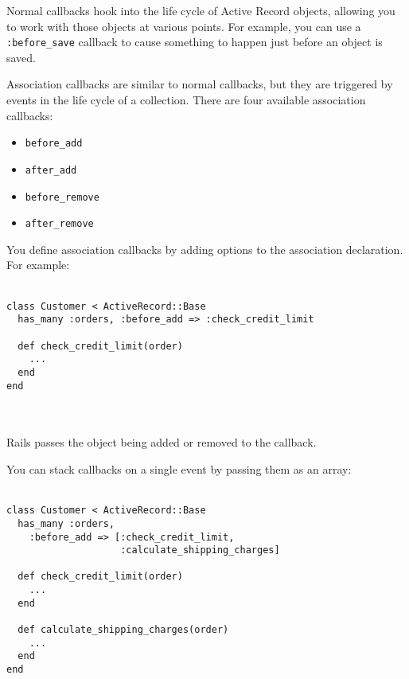 \documentclass[10pt]{book}
\begin{document}
Normal callbacks hook into the life cycle of Active Record objects,  allowing you to work with those objects at various points. For example,  you can use a \texttt{:before\_save} callback to cause something to happen just before an object is saved.

Association callbacks are similar to normal callbacks, but they are  triggered by events in the life cycle of a collection. There are four  available association callbacks:
\begin{itemize}
	\item \texttt{before\_add}
	\item \texttt{after\_add}
	\item \texttt{before\_remove}
	\item \texttt{after\_remove}
\end{itemize}

You define association callbacks by adding options to the association declaration. For example:
\\ \\
\begin{minipage}{\textwidth}{\scriptsize
\begin{verbatim}
class Customer < ActiveRecord::Base
  has_many :orders, :before_add => :check_credit_limit
 
  def check_credit_limit(order)
    ...
  end
end
\end{verbatim}}
\end{minipage}
\\ \\

Rails passes the object being added or removed to the callback.

You can stack callbacks on a single event by passing them as an array:
\\ \\
\begin{minipage}{\textwidth}{\scriptsize
\begin{verbatim}
class Customer < ActiveRecord::Base
  has_many :orders,
    :before_add => [:check_credit_limit, 
                    :calculate_shipping_charges]
 
  def check_credit_limit(order)
    ...
  end
 
  def calculate_shipping_charges(order)
    ...
  end
end
\end{verbatim}}
\end{minipage}
\\ \\
\end{document}
